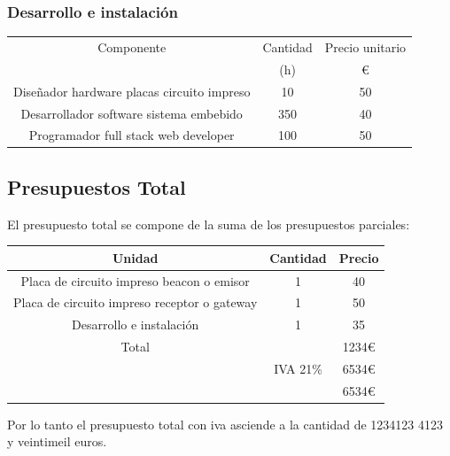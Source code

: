 \documentclass[paper=a4, fontsize=11pt,twoside]{scrartcl}	%
\begin{document}
            \subsubsection{Desarrollo e instalación}
            \begin{center}
                \begin{tabular}{||c | c |c ||} 
                \hline
                Componente & Cantidad  & Precio unitario  \\ [0.5ex] 
                 & (h) & € \\ [0.5ex] 
                \hline\hline
                    Diseñador hardware placas circuito impreso   & 10  & 50 \\ 
                    Desarrollador  software sistema embebido     & 350 & 40 \\ 
                    Programador full stack web developer         & 100 & 50 \\ 
                \hline
                \end{tabular}
            \end{center}
    \subsection{Presupuestos Total}
        El presupuesto total se compone de la suma de los presupuestos parciales:
        \begin{center}
            \begin{tabular}{||c | c |c ||} 
            \hline
            Unidad & Cantidad & Precio  \\ [0.5ex] 
            \hline\hline
            Placa de circuito impreso beacon o emisor & 1 & 40 \\ 
            Placa de circuito impreso receptor o gateway & 1 & 50 \\ 
            Desarrollo e instalación & 1 & 35 \\ 
            \hline
            \hline
            Total &  & 1234€ \\ 
             & IVA 21\%& 6534€ \\ 
             & & 6534€ \\ 
            \hline
            \end{tabular}
        \end{center}
        Por lo tanto el presupuesto total con iva asciende a la cantidad de 1234123 4123 y veintimeil euros.
\end{document}
